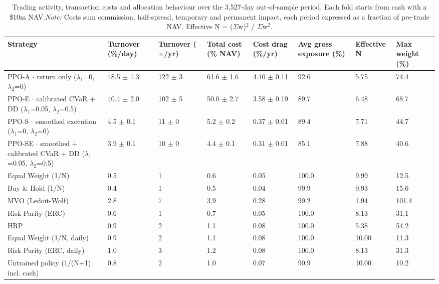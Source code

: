 \documentclass[11pt]{article}
\begin{document}
\begin{table}[!htbp]
\centering\scriptsize
\caption{Trading activity, transaction costs and allocation behaviour over the 3,527-day out-of-sample period. Each fold starts from cash with a \$10m NAV.\label{tab-costs-no} \emph{Note:} Costs sum commission, half-spread, temporary and permanent impact, each period expressed as a fraction of pre-trade NAV. Effective N = ($\Sigma$\textbar w\textbar)$^2$ / $\Sigma$w$^2$.}
\begin{adjustbox}{max width=\linewidth}
\begin{tabular}{@{}llllllll@{}}
\toprule
Strategy & Turnover (\%/day) & Turnover ($\times$/yr) & Total cost (\% NAV) & Cost drag (\%/yr) & Avg gross exposure (\%) & Effective N & Max weight (\%) \\
\midrule
PPO-A $\cdot$ return only {($\lambda_1$=0, $\lambda_2$=0)} & 48.5{ $\pm$ 1.3} & 122{ $\pm$ 3} & 61.6{ $\pm$ 1.6} & 4.40{ $\pm$ 0.11} & 92.6 & 5.75 & 74.4 \\
PPO-E $\cdot$ calibrated CVaR + DD {($\lambda_1$=0.05, $\lambda_2$=0.5)} & 40.4{ $\pm$ 2.0} & 102{ $\pm$ 5} & 50.0{ $\pm$ 2.7} & 3.58{ $\pm$ 0.19} & 89.7 & 6.48 & 68.7 \\
PPO-S $\cdot$ smoothed execution {($\lambda_1$=0, $\lambda_2$=0)} & 4.5{ $\pm$ 0.1} & 11{ $\pm$ 0} & 5.2{ $\pm$ 0.2} & 0.37{ $\pm$ 0.01} & 89.4 & 7.71 & 44.7 \\
PPO-SE $\cdot$ smoothed + calibrated CVaR + DD {($\lambda_1$=0.05, $\lambda_2$=0.5)} & 3.9{ $\pm$ 0.1} & 10{ $\pm$ 0} & 4.4{ $\pm$ 0.1} & 0.31{ $\pm$ 0.01} & 85.1 & 7.88 & 40.6 \\
Equal Weight (1/N) & 0.5 & 1 & 0.6 & 0.05 & 100.0 & 9.99 & 12.5 \\
Buy \& Hold (1/N) & 0.4 & 1 & 0.5 & 0.04 & 99.9 & 9.93 & 15.6 \\
MVO (Ledoit-Wolf) & 2.8 & 7 & 3.9 & 0.28 & 99.2 & 1.94 & 101.4 \\
Risk Parity (ERC) & 0.6 & 1 & 0.7 & 0.05 & 100.0 & 8.13 & 31.1 \\
HRP & 0.9 & 2 & 1.1 & 0.08 & 100.0 & 5.38 & 54.2 \\
Equal Weight (1/N, daily) & 0.9 & 2 & 1.1 & 0.08 & 100.0 & 10.00 & 11.3 \\
Risk Parity (ERC, daily) & 1.0 & 3 & 1.2 & 0.08 & 100.0 & 8.13 & 31.3 \\
Untrained policy (1/(N+1) incl. cash) & 0.8 & 2 & 1.0 & 0.07 & 90.9 & 10.00 & 10.2 \\
\bottomrule
\end{tabular}
\end{adjustbox}
\end{table}
\end{document}
